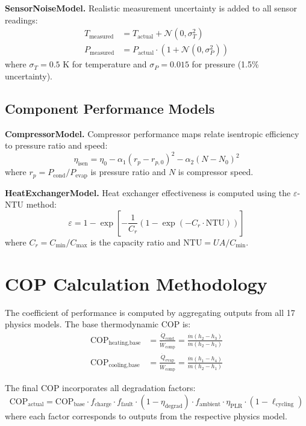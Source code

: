 \documentclass[11pt]{article}
\begin{document}
\textbf{SensorNoiseModel.} Realistic measurement uncertainty is added to all sensor readings:
\begin{align}
T_{\text{measured}} &= T_{\text{actual}} + \mathcal{N}(0, \sigma_T^2) \\
P_{\text{measured}} &= P_{\text{actual}} \cdot (1 + \mathcal{N}(0, \sigma_P^2))
\end{align}
where $\sigma_T = 0.5$ K for temperature and $\sigma_P = 0.015$ for pressure (1.5\% uncertainty).

\subsection{Component Performance Models}

\textbf{CompressorModel.} Compressor performance maps relate isentropic efficiency to pressure ratio and speed:
\begin{equation}
\eta_{\text{isen}} = \eta_0 - \alpha_1(r_p - r_{p,0})^2 - \alpha_2(N - N_0)^2
\end{equation}
where $r_p = P_{\text{cond}}/P_{\text{evap}}$ is pressure ratio and $N$ is compressor speed.

\textbf{HeatExchangerModel.} Heat exchanger effectiveness is computed using the $\varepsilon$-NTU method:
\begin{equation}
\varepsilon = 1 - \exp\left[-\frac{1}{C_r}\left(1 - \exp(-C_r \cdot \text{NTU})\right)\right]
\end{equation}
where $C_r = C_{\min}/C_{\max}$ is the capacity ratio and $\text{NTU} = UA/C_{\min}$.

\section{COP Calculation Methodology}

The coefficient of performance is computed by aggregating outputs from all 17 physics models. The base thermodynamic COP is:
\begin{align}
\text{COP}_{\text{heating,base}} &= \frac{\dot{Q}_{\text{cond}}}{\dot{W}_{\text{comp}}} = \frac{\dot{m}(h_2 - h_3)}{\dot{m}(h_2 - h_1)} \\
\text{COP}_{\text{cooling,base}} &= \frac{\dot{Q}_{\text{evap}}}{\dot{W}_{\text{comp}}} = \frac{\dot{m}(h_1 - h_4)}{\dot{m}(h_2 - h_1)}
\end{align}

The final COP incorporates all degradation factors:
\begin{equation}
\text{COP}_{\text{actual}} = \text{COP}_{\text{base}} \cdot f_{\text{charge}} \cdot f_{\text{fault}} \cdot (1 - \eta_{\text{degrad}}) \cdot f_{\text{ambient}} \cdot \eta_{\text{PLR}} \cdot (1 - \ell_{\text{cycling}})
\end{equation}
where each factor corresponds to outputs from the respective physics model.
\end{document}
